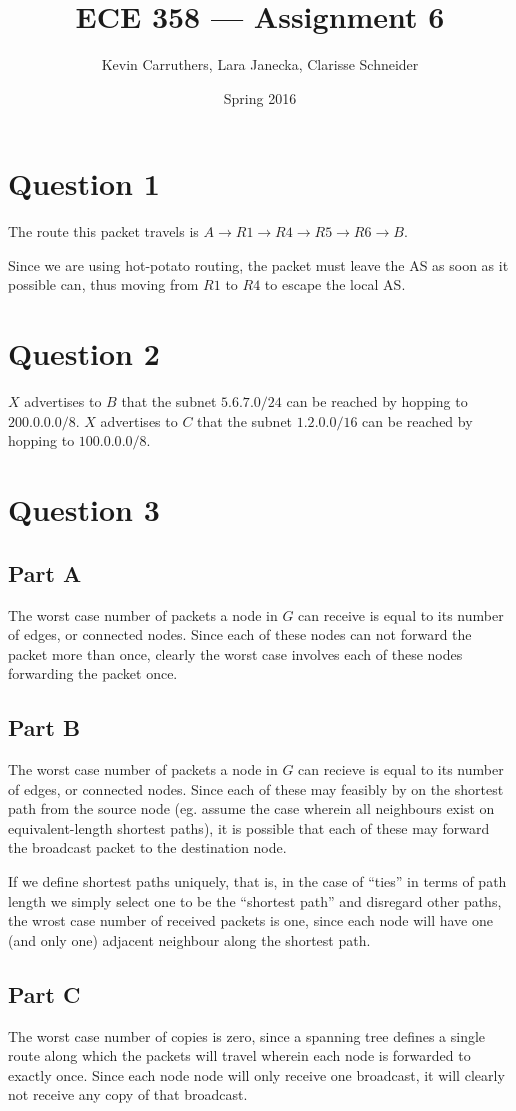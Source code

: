 \documentclass[12pt]{article}
\begin{document}
\title{ECE 358 --- Assignment 6}
\author{Kevin Carruthers, Lara Janecka, Clarisse Schneider}
\date{\vspace{-2ex}Spring 2016}
\maketitle\HRule

\section*{Question 1}
The route this packet travels is $A \to R1 \to R4 \to R5 \to R6 \to B$.

Since we are using hot-potato routing, the packet must leave the AS as soon as it possible can, thus moving from $R1$ to $R4$ to escape the local AS.

\section*{Question 2}
$X$ advertises to $B$ that the subnet $5.6.7.0/24$ can be reached by hopping to $200.0.0.0/8$. $X$ advertises to $C$ that the subnet $1.2.0.0/16$ can be reached by hopping to $100.0.0.0/8$.

\section*{Question 3}
\subsection*{Part A}
The worst case number of packets a node in $G$ can receive is equal to its number of edges, or connected nodes. Since each of these nodes can not forward the packet more than once, clearly the worst case involves each of these nodes forwarding the packet once.

\subsection*{Part B}
The worst case number of packets a node in $G$ can recieve is equal to its number of edges, or connected nodes. Since each of these may feasibly by on the shortest path from the source node (eg. assume the case wherein all neighbours exist on equivalent-length shortest paths), it is possible that each of these may forward the broadcast packet to the destination node.

If we define shortest paths uniquely, that is, in the case of ``ties'' in terms of path length we simply select one to be the ``shortest path'' and disregard other paths, the wrost case number of received packets is one, since each node will have one (and only one) adjacent neighbour along the shortest path.

\subsection*{Part C}
The worst case number of copies is zero, since a spanning tree defines a single route along which the packets will travel wherein each node is forwarded to exactly once. Since each node node will only receive one broadcast, it will clearly not receive any copy of that broadcast.
\end{document}
